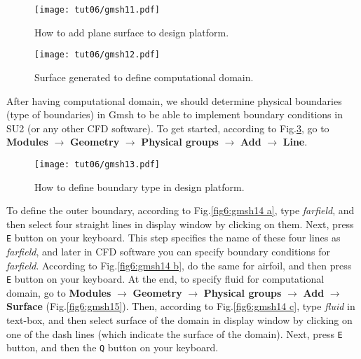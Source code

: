 \begin{figure}[htbp]
    \centering
    \texttt{[image: tut06/gmsh11.pdf]}
    \caption{How to add plane surface to design platform.}
    \label{fig6:gmsh11}
\end{figure}
\begin{figure}[htbp]
    \centering
    \texttt{[image: tut06/gmsh12.pdf]}
    \caption{Surface generated to define computational domain.}
    \label{fig6:gmsh12}
\end{figure}
After having computational domain, we should determine physical boundaries (type of boundaries) in Gmsh to be able to implement boundary conditions in SU2 (or any other CFD software). To get started, according to Fig.\ref{fig6:gmsh13}, go to \textbf{Modules} $\rightarrow$ \textbf{Geometry} $\rightarrow$ \textbf{Physical groups} $\rightarrow$ \textbf{Add} $\rightarrow$ \textbf{Line}.
\begin{figure}[htbp]
    \centering
    \texttt{[image: tut06/gmsh13.pdf]}
    \caption{How to define boundary type in design platform.}
    \label{fig6:gmsh13}
\end{figure}
To define the outer boundary, according to Fig.\ref{fig6:gmsh14 a}, type \textit{farfield}, and then select four straight lines in display window by clicking on them. Next, press \texttt{E} button on your keyboard. This step specifies the name of these four lines as \textit{farfield}, and later in CFD software you can specify boundary conditions for \textit{farfield}. According to Fig.\ref{fig6:gmsh14 b}, do the same for airfoil, and then press \texttt{E} button on your keyboard. At the end, to specify fluid for computational domain, go to \textbf{Modules} $\rightarrow$ \textbf{Geometry} $\rightarrow$ \textbf{Physical groups} $\rightarrow$ \textbf{Add} $\rightarrow$ \textbf{Surface} (Fig.\ref{fig6:gmsh15}). Then, according to Fig.\ref{fig6:gmsh14 c}, type \textit{fluid} in text-box, and then select surface of the domain in display window by clicking on one of the dash lines (which indicate the surface of the domain). Next, press \texttt{E} button, and then  the \texttt{Q} button on your keyboard.
